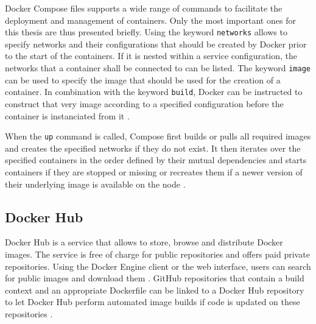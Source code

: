     Docker Compose files supports a wide range of commands to facilitate the deployment and management of containers. Only the most important ones for this thesis are thus presented briefly.
    Using the keyword \texttt{networks} allows to specify networks and their configurations that should be created by Docker prior to the start of the containers. If it is nested within a service configuration, the networks that a container shall be connected to can be listed.
    The keyword \texttt{image} can be used to specify the image that should be used for the creation of a container. In combination with the keyword \texttt{build}, Docker can be instructed to construct that very image according to a specified configuration before the container is instanciated from it \cite{Docker2016Docker}.

    When the \texttt{up} command is called, Compose first builds or pulls all required images and creates the specified networks if they do not exist. It then iterates over the specified containers in the order defined by their mutual dependencies and starts containers if they are stopped or missing or recreates them if a newer version of their underlying image is available on the node \cite{Docker2016Docker}.


  \subsection{Docker Hub} %
  \label{sub:docker_hub}
    Docker Hub is a service that allows to store, browse and distribute Docker images. The service is free of charge for public repositories and offers paid private repositories. Using the Docker Engine client or the web interface, users can search for public images and download them \cite[p.~4]{Boettiger2015Introduction}. GitHub repositories that contain a build context and an appropriate Dockerfile can be linked to a Docker Hub repository to let Docker Hub perform automated image builds if code is updated on these repositories \cite{Docker2016Docker}.


